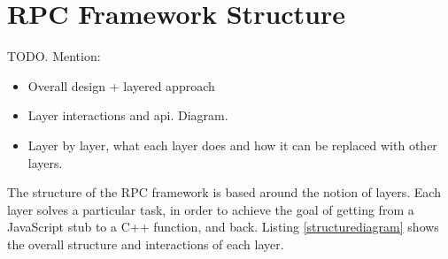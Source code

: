\section{RPC Framework Structure} %
\label{sec:rpc_framework_structure}

TODO. Mention:
\begin{itemize}
	\item Overall design + layered approach
	\item Layer interactions and api. Diagram.
	\item Layer by layer, what each layer does and how it can be replaced with other layers.
\end{itemize}

The structure of the RPC framework is based around the notion of layers. 
Each layer solves a particular task, in order to achieve the goal of getting from a JavaScript stub to a C++ function, and back. Listing \ref{structurediagram} shows the overall structure and interactions of each layer.

